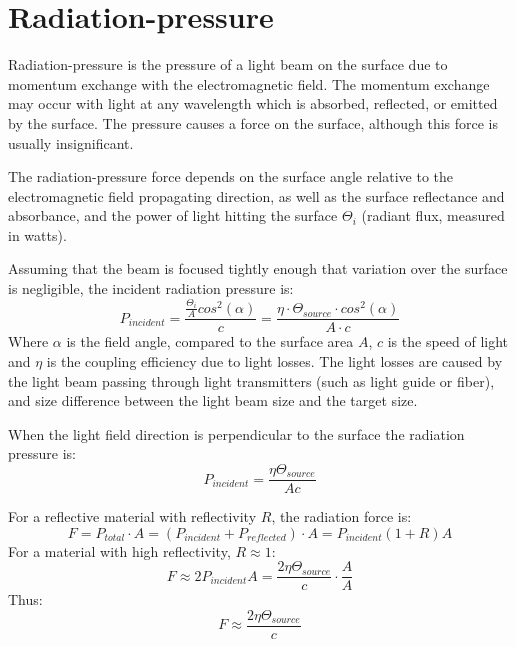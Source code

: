 \documentclass[\main/master.tex]{subfiles}
\begin{document}
\section{Radiation-pressure}
Radiation-pressure is the pressure of a light beam on the surface due to momentum exchange with the electromagnetic field. The momentum exchange may occur with light at any wavelength which is absorbed, reflected, or emitted by the surface. The pressure causes a force on the surface, although this force is usually insignificant.
  
\par\noindent
The radiation-pressure force depends on the surface angle relative to the electromagnetic field propagating direction, as well as the surface reflectance and absorbance, and the power of light hitting the surface $\Theta_i$ (radiant flux, measured in watts). 
\par\noindent
Assuming that the beam is focused tightly enough that variation over the surface is negligible, the incident radiation pressure is:
\begin{equation}
P_{incident} = \frac{\frac{\Theta_i}{A}cos^2(\alpha)}{c} = \frac{\eta\cdot \Theta_{source}\cdot cos^2(\alpha)}{{A\cdot c}} \label{eqn:radiation_pressure}
\end{equation}
Where $\alpha$ is the field angle, compared to the surface area $A$, $c$ is the speed of light and $\eta$ is the coupling efficiency due to light losses. The light losses are caused by the light beam passing through light transmitters (such as light guide or fiber), and size difference between the light beam size and the target size. 
\par\noindent
When the light field direction is perpendicular to the surface the radiation pressure is:
\begin{equation}
P_{incident} = \frac{\eta\Theta_{source}}{{Ac}} \label{eqn:radiation_pressure_perpendicular}
\end{equation}
\par\noindent
For a reflective material with reflectivity $R$, the radiation force is:
\begin{equation}
F = P_{total}\cdot A = (P_{incident}+P_{reflected})\cdot A = P_{incident}(1+R)A \label{eqn:radiation_force}
\end{equation}
For a material with high reflectivity, $R\approx 1$:
\begin{equation}
F \approx 2P_{incident}A = \frac{2\eta\Theta_{source}}{{c}}\cdot \frac{A}{A} \label{eqn:radiation_force_reflective}
\end{equation}
Thus:
\begin{equation}
F \approx \frac{2\eta\Theta_{source}}{{c}} \label{eqn:radiation_force_power}
\end{equation}
\end{document}
